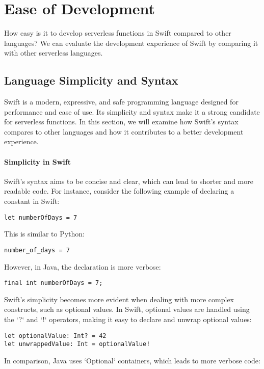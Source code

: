 \chapter{Ease of Development}
How easy is it to develop serverless functions in Swift compared to other languages? We can evaluate the development experience of Swift by comparing it with other serverless languages.


\section{Language Simplicity and Syntax}
Swift is a modern, expressive, and safe programming language designed for performance and ease of use. Its simplicity and syntax make it a strong candidate for serverless functions. In this section, we will examine how Swift's syntax compares to other languages and how it contributes to a better development experience.

\subsubsection{Simplicity in Swift}
Swift's syntax aims to be concise and clear, which can lead to shorter and more readable code. For instance, consider the following example of declaring a constant in Swift:

\begin{verbatim}
let numberOfDays = 7
\end{verbatim}

This is similar to Python:

\begin{verbatim}
number_of_days = 7
\end{verbatim}

However, in Java, the declaration is more verbose:

\begin{verbatim}
final int numberOfDays = 7;
\end{verbatim}

Swift's simplicity becomes more evident when dealing with more complex constructs, such as optional values. In Swift, optional values are handled using the `?` and `!` operators, making it easy to declare and unwrap optional values:

\begin{verbatim}
let optionalValue: Int? = 42
let unwrappedValue: Int = optionalValue!
\end{verbatim}

In comparison, Java uses `Optional` containers, which leads to more verbose code:

